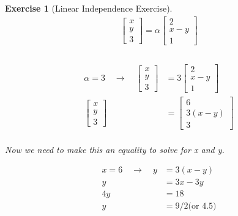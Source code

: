 \documentclass[12pt]{article}
\theoremstyle{plain}
\theoremstyle{nonumberplain}
\theoremstyle{plain}
\newtheorem{exercise}[lemma]{Exercise}
\theoremstyle{nonumberplain}
\newcommand\1{{\bf 1}}
\newcommand{\bmat}[1]{\begin{bmatrix*} #1 \end{bmatrix*}} %
\newcommand{\<}{\left\langle}
\renewcommand{\>}{\right\rangle}
\begin{document}
\begin{exercise} [Linear Independence Exercise]
\begin{equation}
\begin{split}
	\bmat{x\\ y\\ 3} = \alpha\bmat{2\\ x-y\\ 1}\\
\end{split}
\end{equation}
\\
\begin{equation*}
\begin{split}
	\alpha = 3 \quad \rightarrow \quad \bmat{x\\ y\\ 3} &= 3\bmat{2\\ x-y\\ 1}\\
	\bmat{x\\ y\\ 3} &= \bmat{6\\ 3(x-y)\\ 3}\\ 
\end{split}
\end{equation*}
\begin{center}
Now we need to make this an equality to solve for x and y.
\end{center}
\begin{equation*}
\begin{split}
	x = 6 \quad \rightarrow \quad y &= 3(x-y)\\
	y &= 3x - 3y\\
	4y &= 18\\
	y &= 9/2 \text{(or 4.5)}
\end{split}
\end{equation*}
\end{exercise}

\pagebreak
\end{document}
